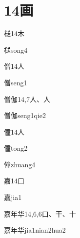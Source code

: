 
\section*{14画}

\begin{Entry}{㮸}{14}{⽊}
  \begin{Phonetics}{㮸}{song4}
  \end{Phonetics}
\end{Entry}

\begin{Entry}{僧}{14}{⼈}
  \begin{Phonetics}{僧}{seng1}
  \end{Phonetics}
\end{Entry}

\begin{Entry}{僧伽}{14,7}{⼈、⼈}
  \begin{Phonetics}{僧伽}{seng1qie2}
  \end{Phonetics}
\end{Entry}

\begin{Entry}{僮}{14}{⼈}
  \begin{Phonetics}{僮}{tong2}
  \end{Phonetics}
  \begin{Phonetics}{僮}{zhuang4}
  \end{Phonetics}
\end{Entry}

\begin{Entry}{嘉}{14}{⼝}
  \begin{Phonetics}{嘉}{jia1}
  \end{Phonetics}
\end{Entry}

\begin{Entry}{嘉年华}{14,6,6}{⼝、⼲、⼗}
  \begin{Phonetics}{嘉年华}{jia1nian2hua2}
  \end{Phonetics}
\end{Entry}


